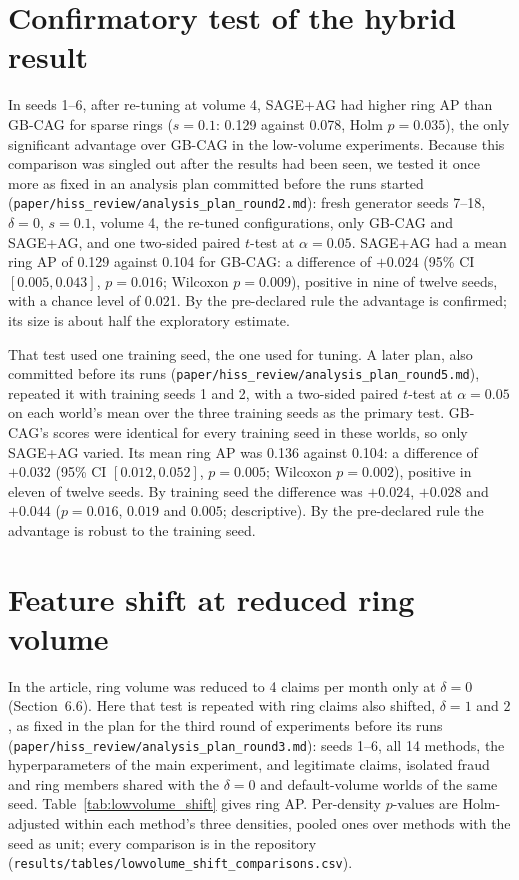 \documentclass[pdflatex,sn-vancouver-num]{sn-jnl}
\newcommand{\MainSecLowVolume}{6.6}
\begin{document}
\section{Confirmatory test of the hybrid result}\label{sec:s_confirm}
In seeds 1--6, after re-tuning at volume 4, SAGE+AG had higher ring AP than GB-CAG for sparse rings
($s=0.1$: 0.129 against 0.078, Holm $p=0.035$), the only significant advantage over GB-CAG in the
low-volume experiments. Because this comparison was singled out after the results had been seen, we tested
it once more as fixed in an analysis plan committed before the runs started
(\texttt{paper/\allowbreak hiss\_review/\allowbreak analysis\_plan\_round2.md}): fresh generator seeds 7--18, $\delta=0$,
$s=0.1$, volume 4, the re-tuned configurations, only GB-CAG and SAGE+AG, and one two-sided paired $t$-test
at $\alpha=0.05$. SAGE+AG had a mean ring AP of 0.129 against 0.104 for GB-CAG: a difference of $+0.024$
(95\% CI $[0.005, 0.043]$, $p=0.016$; Wilcoxon $p=0.009$), positive in nine of twelve seeds, with a
chance level of 0.021. By the pre-declared rule the advantage is confirmed; its size is about half the
exploratory estimate.

That test used one training seed, the one used for tuning. A later plan, also committed before its runs
(\texttt{paper/\allowbreak hiss\_review/\allowbreak analysis\_plan\_round5.md}), repeated it with training seeds 1 and 2, with a two-sided
paired $t$-test at $\alpha=0.05$ on each world's mean over the three training seeds as the primary test. GB-CAG's
scores were identical for every training seed in these worlds, so only SAGE+AG varied. Its mean ring AP was 0.136
against 0.104: a difference of $+0.032$ (95\% CI $[0.012, 0.052]$, $p=0.005$; Wilcoxon $p=0.002$), positive in eleven
of twelve seeds. By training seed the difference was $+0.024$, $+0.028$ and $+0.044$ ($p=0.016$, $0.019$ and $0.005$;
descriptive). By the pre-declared rule the advantage is robust to the training seed.

\section{Feature shift at reduced ring volume}\label{sec:s_shift}
In the article, ring volume was reduced to 4 claims per month only at $\delta=0$ (Section~\MainSecLowVolume{}).
Here that test is repeated with ring claims also shifted, $\delta=1$ and $2$, as fixed in the plan for the third
round of experiments before its runs (\texttt{paper/\allowbreak hiss\_review/\allowbreak analysis\_plan\_round3.md}): seeds 1--6, all 14
methods, the hyperparameters of the main experiment, and legitimate claims, isolated fraud and ring members shared
with the $\delta=0$ and default-volume worlds of the same seed. Table~\ref{tab:lowvolume_shift} gives ring AP.
Per-density $p$-values are Holm-adjusted within each method's three densities, pooled ones over methods with the
seed as unit; every comparison is in the repository (\texttt{results/tables/lowvolume\_shift\_comparisons.csv}).
\end{document}
